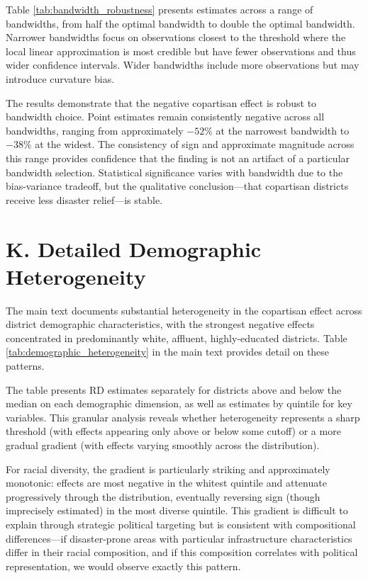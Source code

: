 \documentclass[12pt,letterpaper,oneside]{book}
\newcommand{\basepath}{g:/My Drive/Grad School}
\newcommand{\basepath}{basepath}
\begin{document}
Table \ref{tab:bandwidth_robustness} presents estimates across a range of bandwidths, from half the optimal bandwidth to double the optimal bandwidth. Narrower bandwidths focus on observations closest to the threshold where the local linear approximation is most credible but have fewer observations and thus wider confidence intervals. Wider bandwidths include more observations but may introduce curvature bias.

The results demonstrate that the negative copartisan effect is robust to bandwidth choice. Point estimates remain consistently negative across all bandwidths, ranging from approximately $-52\%$ at the narrowest bandwidth to $-38\%$ at the widest. The consistency of sign and approximate magnitude across this range provides confidence that the finding is not an artifact of a particular bandwidth selection. Statistical significance varies with bandwidth due to the bias-variance tradeoff, but the qualitative conclusion---that copartisan districts receive less disaster relief---is stable.


\label{tab:bandwidth_robustness}

\section*{K. Detailed Demographic Heterogeneity}

The main text documents substantial heterogeneity in the copartisan effect across district demographic characteristics, with the strongest negative effects concentrated in predominantly white, affluent, highly-educated districts. Table \ref{tab:demographic_heterogeneity} in the main text provides detail on these patterns.

The table presents RD estimates separately for districts above and below the median on each demographic dimension, as well as estimates by quintile for key variables. This granular analysis reveals whether heterogeneity represents a sharp threshold (with effects appearing only above or below some cutoff) or a more gradual gradient (with effects varying smoothly across the distribution).

For racial diversity, the gradient is particularly striking and approximately monotonic: effects are most negative in the whitest quintile and attenuate progressively through the distribution, eventually reversing sign (though imprecisely estimated) in the most diverse quintile. This gradient is difficult to explain through strategic political targeting but is consistent with compositional differences---if disaster-prone areas with particular infrastructure characteristics differ in their racial composition, and if this composition correlates with political representation, we would observe exactly this pattern.
\end{document}
